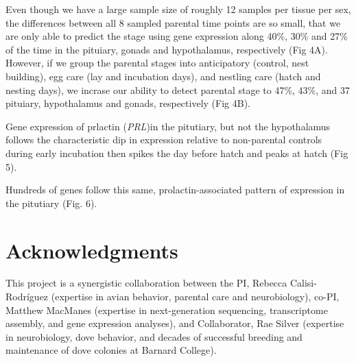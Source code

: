 \documentclass[10pt,letterpaper]{article}
\begin{document}
Even though we have a large sample size of roughly 12 samples per tissue
per sex, the differences between all 8 sampled parental time points are
so small, that we are only able to predict the stage using gene
expression along 40\%, 30\% and 27\% of the time in the pituiary, gonads
and hypothalamus, respectively (Fig 4A). However, if we group the
parental stages into anticipatory (control, nest building), egg care
(lay and incubation days), and nestling care (hatch and nesting days),
we incrase our ability to detect parental stage to 47\%, 43\%, and 37
pituiary, hypothalamus and gonads, respectively (Fig 4B).

Gene expression of prlactin (\emph{PRL})in the pitutiary, but not the
hypothalamus follows the characteristic dip in expression relative to
non-parental controls during early incubation then spikes the day before
hatch and peaks at hatch (Fig 5).

Hundreds of genes follow this same, prolactin-associated pattern of
expression in the pitutiary (Fig. 6).

\hypertarget{acknowledgments}{%
\section{Acknowledgments}\label{acknowledgments}}

This project is a synergistic collaboration between the PI, Rebecca
Calisi-Rodríguez (expertise in avian behavior, parental care and
neurobiology), co-PI, Matthew MacManes (expertise in next-generation
sequencing, transcriptome assembly, and gene expression analyses), and
Collaborator, Rae Silver (expertise in neurobiology, dove behavior, and
decades of successful breeding and maintenance of dove colonies at
Barnard College).
\end{document}
